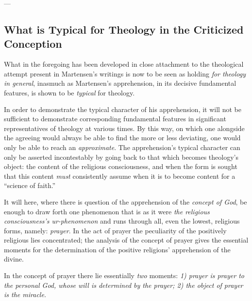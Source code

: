 \documentclass[12pt,a4paper]{book}
\begin{document}
\begin{center}---\end{center}

\subsection{What is Typical for Theology in the Criticized Conception}
\label{ssec:typical}

What in the foregoing has been developed in close attachment to the theological attempt
present in Martensen's writings is now to be seen as holding \emph{for theology in general},
inasmuch as Martensen's apprehension, in its decisive fundamental features, is shown
to be \emph{typical} for theology.

In order to demonstrate the typical character of his apprehension, it will not be sufficient
to demonstrate corresponding fundamental features in significant representatives of theology
at various times. By this way, on which one alongside the agreeing would always be able to
find the more or less deviating, one would only be able to reach an \emph{approximate}. The
apprehension's typical character can only be asserted incontestably by going back to that
which becomes theology's object: the content of the religious consciousness, and when the
form is sought that this content \emph{must} consistently assume when it is to become content for a
``science of faith.''

It will here, where there is question of the apprehension of the \emph{concept of God}, be enough
to draw forth one phenomenon that is as it were \emph{the religious consciousness's
ur-phenomenon} and runs through all, even the lowest, religious forms, namely: \emph{prayer}.
In the act of prayer the peculiarity of the positively religious lies concentrated; the
analysis of the concept of prayer gives the essential moments for the determination of the
positive religions' apprehension of the divine.

In the concept of prayer there lie essentially \emph{two} moments: \emph{1) prayer is prayer to the
personal God, whose will is determined by the prayer; 2) the object of prayer is the
miracle.}
\end{document}
